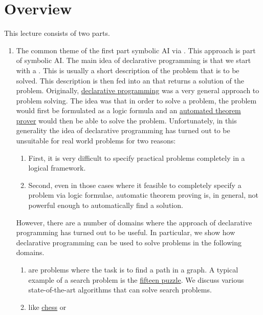 \section{Overview}
This lecture consists of two parts.
\begin{enumerate}
\item The common theme of the first part symbolic AI via .  This approach is part
      of symbolic  AI.  The main idea of declarative 
      programming is that we start with a .  This is usually a short description of
      the problem that is to be solved.  This description is then fed into an 
      that returns a solution of the problem.  Originally, 
      \href{https://en.wikipedia.org/wiki/Declarative_programming}{declarative programming} was a very general
      approach to problem solving.  The idea was that in order to solve a problem, the problem would first be
      formulated as a logic formula and an
      \href{https://en.wikipedia.org/wiki/Automated_theorem_proving}{automated theorem prover} would then be
      able to solve the problem.  Unfortunately, in this generality the idea of declarative programming has
      turned out to be unsuitable for real world problems for two reasons:
      \begin{enumerate}
      \item First, it is very difficult to specify practical problems completely in a logical framework.
      \item Second, even in those cases where it feasible to completely specify a problem via logic formulae,
            automatic theorem proving is, in general, not powerful enough to automatically find a solution. 
      \end{enumerate}
      However, there are a number of domains where the approach of declarative programming has turned out to be
      useful.  In particular, we show how declarative programming can be used to solve problems in the
      following domains.
      \begin{enumerate}
      \item {} are problems where the task is to find a path in a graph.  A typical example of a
            search problem is the \href{https://en.wikipedia.org/wiki/15_puzzle}{fifteen puzzle}.
            We discuss various state-of-the-art algorithms that can solve search problems.
      \item {} like \href{https://en.wikipedia.org/wiki/Chess}{chess} or

\end{enumerate}
\end{enumerate}
